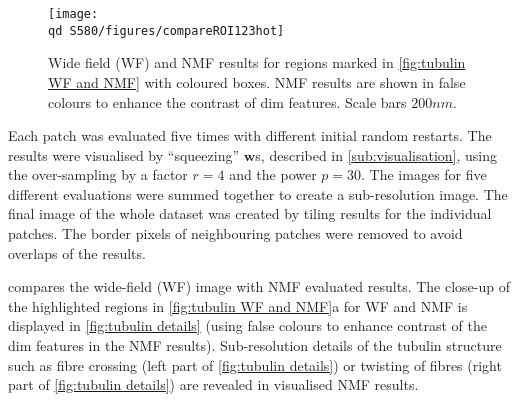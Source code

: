 \begin{figure}[!hb]
	\centering
	\texttt{[image: \\qd S580/figures/compareROI123hot]}
	\caption{Wide field (WF) and NMF results for regions marked in \autoref{fig:tubulin WF and NMF} with coloured boxes. NMF results are shown in false colours to enhance the contrast of dim features. Scale bars $200 \unit{nm}$.} 
	\label{fig:tubulin details}
\end{figure}
% 
Each patch was evaluated five times with different initial random restarts. The results were visualised by ``squeezing'' $\bm{w}$s, described in \autoref{sub:visualisation}, using the over-sampling by a factor $r=4$ and the power $p=30$. The images for five different evaluations were summed together to create a sub-resolution image. The final image of the whole dataset was created by tiling results for the individual patches. The border pixels of neighbouring patches were removed to avoid overlaps of the results.

 compares the wide-field (WF) image with NMF evaluated results. The close-up of the highlighted regions in \autoref{fig:tubulin WF and NMF}a for WF and NMF is displayed in \autoref{fig:tubulin details} (using false colours to enhance contrast of the dim features in the NMF results). Sub-resolution details of the tubulin structure such as fibre crossing (left part of \autoref{fig:tubulin details}) or twisting of fibres (right part of \autoref{fig:tubulin details}) are revealed in visualised NMF results.



